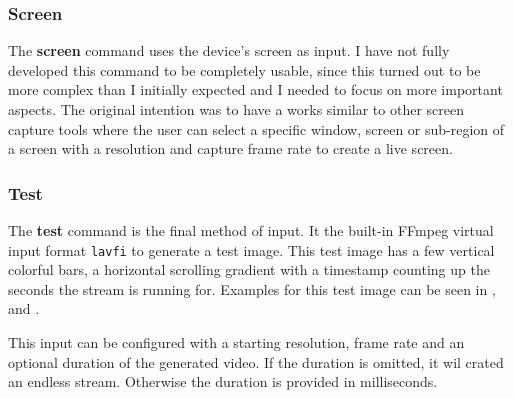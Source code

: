 \subsubsection{Screen}

The \textbf{screen} command uses the device's screen as input. I have not fully developed this command to be completely usable, since this turned out to be more complex than I initially expected and I needed to focus on more important aspects. The original intention was to have a works similar to other screen capture tools where the user can select a specific window, screen or sub-region of a screen with a resolution and capture frame rate to create a live screen.

\subsubsection{Test}

The \textbf{test} command is the final method of input. It the built-in FFmpeg virtual input format \texttt{lavfi} to generate a test image. This test image has a few vertical colorful bars, a horizontal scrolling gradient with a timestamp counting up the seconds the stream is running for. Examples for this test image can be seen in ,  and .

This input can be configured with a starting resolution, frame rate and an optional duration of the generated video. If the duration is omitted, it wil crated an endless stream. Otherwise the duration is provided in milliseconds.

